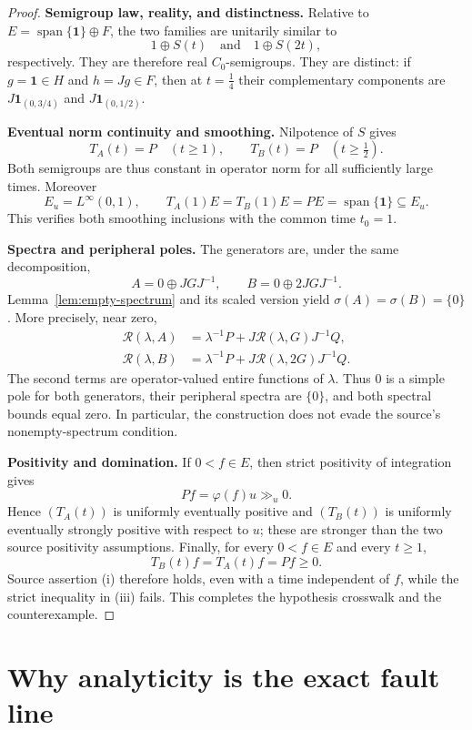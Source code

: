 \documentclass[11pt]{article}
\newcommand{\one}{\mathbf 1}
\newcommand{\R}{\mathcal R}
\begin{document}
\begin{proof}
\medskip\noindent\textbf{Semigroup law, reality, and distinctness.}
Relative to $E=\operatorname{span}\{\one\}\oplus F$, the two families are
unitarily similar to
\[
 1\oplus S(t)\quad\text{and}\quad 1\oplus S(2t),
\]
respectively.  They are therefore real $C_0$-semigroups.  They are distinct:
if $g=\one\in H$ and $h=Jg\in F$, then at $t=\tfrac14$ their complementary
components are $J\one_{(0,3/4)}$ and $J\one_{(0,1/2)}$.

\medskip\noindent\textbf{Eventual norm continuity and smoothing.}
Nilpotence of $S$ gives
\[
 T_A(t)=P\quad(t\geq1),
 \qquad
 T_B(t)=P\quad(t\geq\tfrac12).
\]
Both semigroups are thus constant in operator norm for all sufficiently large
times.  Moreover
\[
 E_u=L^\infty(0,1),
 \qquad T_A(1)E=T_B(1)E=PE=\operatorname{span}\{\one\}\subseteq E_u.
\]
This verifies both smoothing inclusions with the common time $t_0=1$.

\medskip\noindent\textbf{Spectra and peripheral poles.}
The generators are, under the same decomposition,
\[
 A=0\oplus JGJ^{-1},
 \qquad B=0\oplus 2JGJ^{-1}.
\]
Lemma~\ref{lem:empty-spectrum} and its scaled version yield
$\sigma(A)=\sigma(B)=\{0\}$.  More precisely, near zero,
\begin{align*}
 \R(\lambda,A)
   &=\lambda^{-1}P+J\R(\lambda,G)J^{-1}Q,\\
 \R(\lambda,B)
   &=\lambda^{-1}P+J\R(\lambda,2G)J^{-1}Q.
\end{align*}
The second terms are operator-valued entire functions of $\lambda$.  Thus
$0$ is a simple pole for both generators, their peripheral spectra are
$\{0\}$, and both spectral bounds equal zero.  In particular, the
construction does not evade the source's nonempty-spectrum condition.

\medskip\noindent\textbf{Positivity and domination.}
If $0<f\in E$, then strict positivity of integration gives
\[
 Pf=\varphi(f)u\gg_u0.
\]
Hence $(T_A(t))$ is uniformly eventually positive and $(T_B(t))$ is uniformly
eventually strongly positive with respect to $u$; these are stronger than the
two source positivity assumptions.  Finally, for every $0<f\in E$ and every
$t\geq1$,
\[
 T_B(t)f=T_A(t)f=Pf\geq0.
\]
Source assertion \textup{(i)} therefore holds, even with a time independent
of $f$, while the strict inequality in \textup{(iii)} fails.  This completes
the hypothesis crosswalk and the counterexample.
\end{proof}

\section{Why analyticity is the exact fault line}
\end{document}
